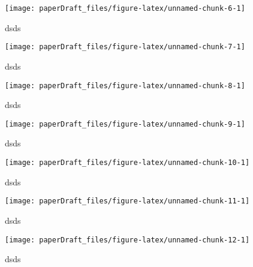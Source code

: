 \documentclass[
  12pt,
  dvipsnames,enabledeprecatedfontcommands]{scrartcl}
\begin{document}
\begin{figure}[H]


\begin{center}\texttt{[image: paperDraft\_files/figure-latex/unnamed-chunk-6-1]} \end{center}
\caption{dsds}
\label{fig:weat1reddit}
\end{figure}

\begin{figure}[H]


\begin{center}\texttt{[image: paperDraft\_files/figure-latex/unnamed-chunk-7-1]} \end{center}
\caption{dsds}
\label{fig:religionGoogle}
\end{figure}

\begin{figure}[H]


\begin{center}\texttt{[image: paperDraft\_files/figure-latex/unnamed-chunk-8-1]} \end{center}
\caption{dsds}
\label{fig:religionGlove}
\end{figure}

\begin{figure}[H]


\begin{center}\texttt{[image: paperDraft\_files/figure-latex/unnamed-chunk-9-1]} \end{center}
\caption{dsds}
\label{fig:religionReddit}
\end{figure}

\begin{figure}[H]


\begin{center}\texttt{[image: paperDraft\_files/figure-latex/unnamed-chunk-10-1]} \end{center}
\caption{dsds}
\label{fig:raceGoogle}
\end{figure}

\begin{figure}[H]


\begin{center}\texttt{[image: paperDraft\_files/figure-latex/unnamed-chunk-11-1]} \end{center}
\caption{dsds}
\label{fig:raceGlove}
\end{figure}

\begin{figure}[H]


\begin{center}\texttt{[image: paperDraft\_files/figure-latex/unnamed-chunk-12-1]} \end{center}
\caption{dsds}
\label{fig:raceReddit}
\end{figure}
\end{document}
